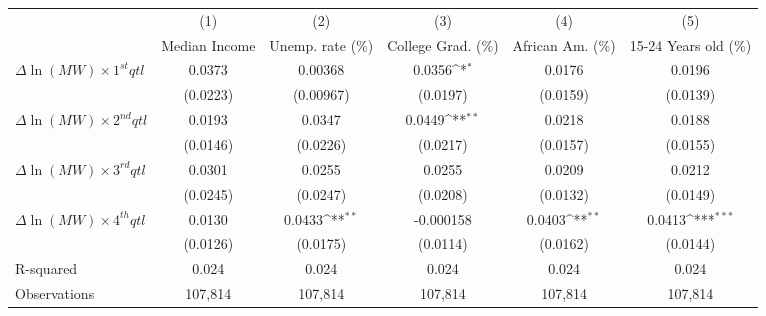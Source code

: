 {
\def\sym#1{\ifmmode^{#1}\else\(^{#1}\)\fi}
\begin{tabular}{l*{5}{c}}
\hline\hline
          &\multicolumn{1}{c}{(1)}&\multicolumn{1}{c}{(2)}&\multicolumn{1}{c}{(3)}&\multicolumn{1}{c}{(4)}&\multicolumn{1}{c}{(5)}\\
          &\multicolumn{1}{c}{Median Income}&\multicolumn{1}{c}{Unemp. rate (\%)}&\multicolumn{1}{c}{College Grad. (\%)}&\multicolumn{1}{c}{African Am. (\%)}&\multicolumn{1}{c}{15-24 Years old (\%)}\\
\hline
$\Delta \ln(MW) \times 1^{st} qtl$&   0.0373         &  0.00368         &   0.0356\sym{*}  &   0.0176         &   0.0196         \\
          & (0.0223)         &(0.00967)         & (0.0197)         & (0.0159)         & (0.0139)         \\
[1em]
$\Delta \ln(MW) \times 2^{nd} qtl$&   0.0193         &   0.0347         &   0.0449\sym{**} &   0.0218         &   0.0188         \\
          & (0.0146)         & (0.0226)         & (0.0217)         & (0.0157)         & (0.0155)         \\
[1em]
$\Delta \ln(MW) \times 3^{rd} qtl$&   0.0301         &   0.0255         &   0.0255         &   0.0209         &   0.0212         \\
          & (0.0245)         & (0.0247)         & (0.0208)         & (0.0132)         & (0.0149)         \\
[1em]
$\Delta \ln(MW) \times 4^{th} qtl$&   0.0130         &   0.0433\sym{**} &-0.000158         &   0.0403\sym{**} &   0.0413\sym{***}\\
          & (0.0126)         & (0.0175)         & (0.0114)         & (0.0162)         & (0.0144)         \\
\hline
R-squared &    0.024         &    0.024         &    0.024         &    0.024         &    0.024         \\
Observations&  107,814         &  107,814         &  107,814         &  107,814         &  107,814         \\
\hline\hline
\end{tabular}
}
